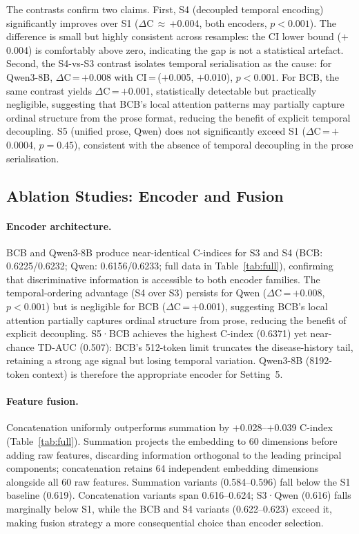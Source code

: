 The contrasts confirm two claims.
First, S4 (decoupled temporal encoding) significantly improves over S1
($\Delta$C\,$\approx$\,$+$0.004, both encoders, $p<0.001$).
The difference is small but highly consistent across resamples: the CI lower
bound ($+$0.004) is comfortably above zero, indicating the gap is not a
statistical artefact.
Second, the S4-vs-S3 contrast isolates temporal serialisation as the cause:
for Qwen3-8B, $\Delta$C\,=\,$+$0.008 with CI\,=\,($+$0.005, $+$0.010),
$p<0.001$.
For BCB, the same contrast yields $\Delta$C\,=\,$+$0.001, statistically
detectable but practically negligible, suggesting that BCB's local
attention patterns may partially capture ordinal structure from the prose
format, reducing the benefit of explicit temporal decoupling.
S5 (unified prose, Qwen) does not significantly exceed S1
($\Delta$C\,=\,$+$0.0004, $p=0.45$), consistent with the absence of
temporal decoupling in the prose serialisation.

\subsection{Ablation Studies: Encoder and Fusion}
\label{sec:encoder}

\paragraph{Encoder architecture.}
BCB and Qwen3-8B produce near-identical C-indices for S3 and S4
(BCB: 0.6225/0.6232; Qwen: 0.6156/0.6233; full data in Table~\ref{tab:full}),
confirming that discriminative information is accessible to both encoder
families.
The temporal-ordering advantage (S4 over S3) persists for Qwen
($\Delta$C\,=\,$+$0.008, $p<0.001$) but is negligible for BCB
($\Delta$C\,=\,$+$0.001), suggesting BCB's local attention partially
captures ordinal structure from prose, reducing the benefit of explicit
decoupling.
S5·BCB achieves the highest C-index (0.6371) yet near-chance TD-AUC
(0.507): BCB's 512-token limit truncates the disease-history tail, retaining
a strong age signal but losing temporal variation.
Qwen3-8B (8192-token context) is therefore the appropriate encoder for
Setting~5.

\paragraph{Feature fusion.}
Concatenation uniformly outperforms summation by $+$0.028--$+$0.039
C-index (Table~\ref{tab:full}).
Summation projects the embedding to 60 dimensions before adding raw
features, discarding information orthogonal to the leading principal
components; concatenation retains 64 independent embedding dimensions
alongside all 60 raw features.
Summation variants (0.584--0.596) fall below the S1 baseline (0.619).
Concatenation variants span 0.616--0.624; S3·Qwen (0.616) falls marginally
below S1, while the BCB and S4 variants (0.622--0.623) exceed it, making
fusion strategy a more consequential choice than encoder selection.


